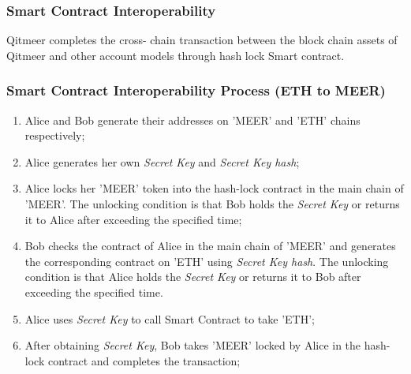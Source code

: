 \documentclass[a4paper,11pt]{article}
\begin{document}
\subsubsection{Smart Contract Interoperability}

Qitmeer completes the cross- chain transaction between the block chain assets of Qitmeer and  other account models through hash lock Smart contract.

\subsubsection*{Smart Contract Interoperability Process (ETH to MEER)}

\begin{enumerate}
\item  Alice and Bob generate their addresses on 'MEER' and 'ETH' chains respectively;

\item   Alice generates her own \textit{Secret Key} and \textit{Secret Key hash};

 \item  Alice locks her 'MEER' token into the hash-lock contract in the main chain of 'MEER'. The unlocking condition is that Bob holds the \textit{Secret Key} or returns it to Alice after exceeding the specified time;

 \item  Bob checks the contract of Alice in the main chain of 'MEER' and generates the corresponding contract on 'ETH' using \textit{Secret Key hash}. The unlocking condition is that Alice holds the \textit{Secret Key } or returns it to Bob after exceeding the specified time.

 \item  Alice uses \textit{Secret Key} to call Smart Contract to take 'ETH';

 \item  After obtaining \textit{Secret Key}, Bob takes 'MEER' locked by Alice in the hash-lock contract and completes the transaction;

\end{enumerate}


\clearpage



%
%


\end{document}
